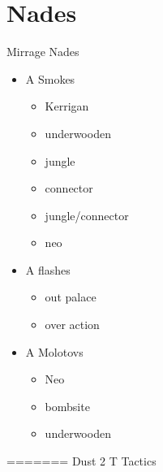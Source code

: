 \section{Nades}
\label{sect:Mirrage_nades}
Mirrage Nades
\begin{itemize}
\item A Smokes
	\begin{itemize}
	\item Kerrigan
	\item underwooden
	\item jungle
	\item connector
	\item jungle/connector
	\item neo
	\end{itemize}
\item A flashes
	\begin{itemize}
	\item out palace
	\item over action
	\end{itemize}
\item A Molotovs
	\begin{itemize}
	\item Neo
	\item bombsite
	\item underwooden
	\end{itemize}
\end{itemize}
=======
\label{sect:mirrage_t}
Dust 2 T Tactics

